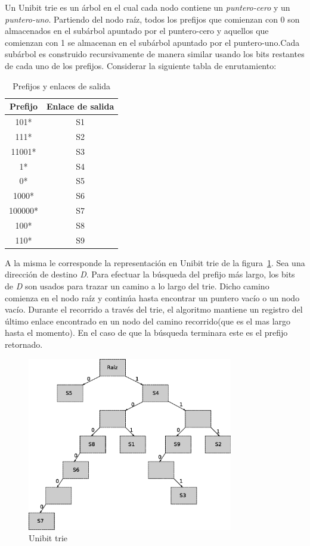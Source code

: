 Un Unibit trie es un árbol en el cual cada nodo contiene un \textit{puntero-cero }y un \textit{puntero-uno}. Partiendo del nodo raíz, todos los prefijos que comienzan con 0 son almacenados en el subárbol apuntado por el puntero-cero y aquellos que comienzan con 1 se almacenan en el subárbol apuntado por el puntero-uno.Cada subárbol es construido recursivamente de manera similar usando los bits restantes de cada uno de los prefijos.
Considerar la siguiente tabla de enrutamiento:
\begin{table}[h]
\begin{center}
	\begin{tabular}{|c|c|} \hline
		\textbf{Prefijo} & \textbf{Enlace de salida} \\ \hline
		101* & S1 \\
		111* & S2 \\
		11001* & S3 \\
		1* & S4 \\
		0* & S5 \\
		1000* & S6 \\
		100000* & S7 \\
		100* & S8 \\
		110* & S9 \\	\hline
	\end{tabular}
	\caption{Prefijos y enlaces de salida}
	\label{tab:prefgw}	
\end{center}
\end{table}



A la misma le corresponde la representación en Unibit trie de la figura~\ref{fig:trie}.
Sea una dirección de destino \textit{D}. Para efectuar la búsqueda del prefijo más largo, los bits de \textit{D} son usados para trazar un camino a lo largo del trie. Dicho camino comienza en el nodo raíz y continúa hasta encontrar un puntero vacío o un nodo vacío. Durante el recorrido a través del trie, el algoritmo mantiene un registro del último enlace encontrado en un nodo del camino recorrido(que es el mas largo hasta el momento). En el caso de que la búsqueda terminara este es el prefijo retornado.

\begin{figure}[h]
  \centering
	\includegraphics[width=0.80\textwidth]{2-sistema/graf/trie.eps}
  \caption{Unibit trie}
  \label{fig:trie}
\end{figure}

